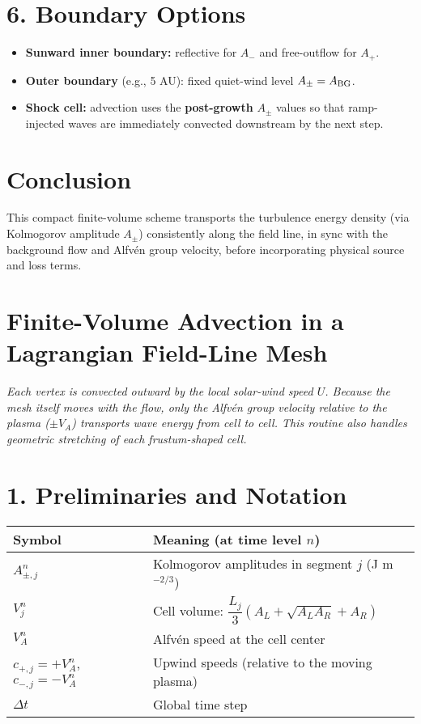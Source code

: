 \section*{6. Boundary Options}

\begin{itemize}
    \item \textbf{Sunward inner boundary:} reflective for $A_{-}$ and free-outflow for $A_{+}$.
    \item \textbf{Outer boundary} (e.g., 5 AU): fixed quiet-wind level $A_\pm = A_{\rm BG}$.
    \item \textbf{Shock cell:} advection uses the \textbf{post-growth} $A_\pm$ values so that ramp-injected waves are immediately convected downstream by the next step.
\end{itemize}

\section*{Conclusion}

This compact finite-volume scheme transports the turbulence energy density (via Kolmogorov amplitude $A_\pm$) consistently along the field line, in sync with the background flow and Alfvén group velocity, before incorporating physical source and loss terms.

\section*{Finite-Volume Advection in a Lagrangian Field-Line Mesh}

\emph{Each vertex is convected outward by the local solar-wind speed $U$.  
Because the mesh itself moves with the flow, only the Alfvén group velocity relative to the plasma ($\pm V_A$) transports wave energy from cell to cell.  
This routine also handles geometric stretching of each frustum-shaped cell.}

\section*{1. Preliminaries and Notation}

\begin{center}
\begin{tabular}{@{}ll@{}}
\toprule
\textbf{Symbol} & \textbf{Meaning (at time level $n$)} \\
\midrule
$A_{\pm,j}^n$ & Kolmogorov amplitudes in segment $j$ (J m$^{-2/3}$) \\
$V_j^n$ & Cell volume: $\dfrac{L_j}{3}\left(A_L + \sqrt{A_L A_R} + A_R\right)$ \\
$V_A^n$ & Alfvén speed at the cell center \\
$c_{+,j} = +V_A^n$, $c_{-,j} = -V_A^n$ & Upwind speeds (relative to the moving plasma) \\
$\Delta t$ & Global time step \\
\bottomrule
\end{tabular}
\end{center}

